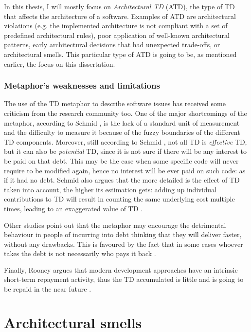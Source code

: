 In this thesis, I will mostly focus on \emph{Architectural TD} (ATD), the type of TD that affects the architecture of a software.
Examples of ATD are architectural violations (e.g. the implemented architecture is not compliant with a set of predefined architectural rules), poor application of well-known architectural patterns, early architectural decisions that had unexpected trade-offs, or architectural smells.
This particular type of ATD is going to be, as mentioned earlier, the focus on this dissertation.

\subsubsection{Metaphor's weaknesses and limitations}
The use of the TD metaphor to describe software issues has received some criticism from the research community too.
One of the major shortcomings of the metaphor, according to Schmid \cite{Schmid2013}, is the lack of a standard unit of measurement and the difficulty to measure it because of the fuzzy boundaries of the different TD components.
Moreover, still according to Schmid \cite{Schmid2013}, not all TD is \textit{effective} TD, but it can also be \textit{potential} TD, since it is not sure if there will be any interest to be paid on that debt.
This may be the case when some specific code will never require to be modified again, hence no interest will be ever paid on such code: as if it had no debt.
Schmid also argues that the more detailed is the effect of TD taken into account, the higher its estimation gets: adding up individual contributions to TD will result in counting the same underlying cost multiple times, leading to an exaggerated value of TD \cite{Schmid2013}.

Other studies point out that the metaphor may encourage the detrimental behaviour in people of incurring into debt thinking that they will deliver faster, without any drawbacks. This is favoured by the fact that in some cases whoever takes the debt is not necessarily who pays it back \cite{Allman2012}.

Finally, Rooney argues that modern development approaches have an intrinsic short-term repayment activity, thus the TD accumulated is little and is going to be repaid in the near future \cite{Rooney2010}.

\section{Architectural smells}
